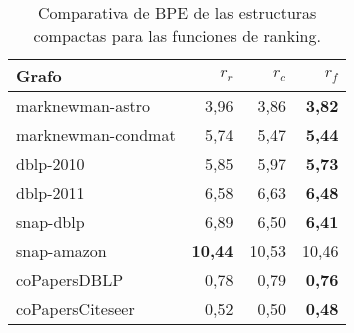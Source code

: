 \begin{table}
	\caption{Comparativa de BPE de las estructuras compactas para las funciones de ranking.}
	\label{table:bpe3}
	\centering
	\begin{tabular}{l|r|r|r}
		\toprule
		Grafo & $r_{r}$ & $r_{c}$ & $r_{f}$\\
		\midrule
		marknewman-astro & 3,96 & 3,86 & \textbf{3,82} \\
        marknewman-condmat & 5,74 & 5,47 & \textbf{5,44} \\
        dblp-2010 & 5,85 & 5,97 & \textbf{5,73} \\
        dblp-2011 & 6,58 & 6,63 & \textbf{6,48} \\
        snap-dblp & 6,89 & 6,50 & \textbf{6,41} \\
        snap-amazon & \textbf{10,44} & 10,53 & 10,46 \\
        coPapersDBLP & 0,78 & 0,79 & \textbf{0,76} \\
        coPapersCiteseer & 0,52 & 0,50 & \textbf{0,48} \\
        \bottomrule
	\end{tabular}
\end{table}
